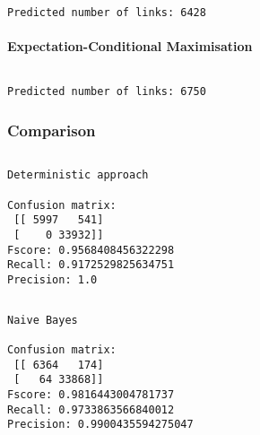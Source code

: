 \documentclass{article}
\begin{document}
    \begin{Verbatim}[commandchars=\\\{\}]
Predicted number of links: 6428

    \end{Verbatim}

    \hypertarget{expectation-conditional-maximisation}{%
\paragraph{Expectation-Conditional
Maximisation}\label{expectation-conditional-maximisation}}

    \begin{Verbatim}[commandchars=\\\{\}]

\end{Verbatim}

    \begin{Verbatim}[commandchars=\\\{\}]
Predicted number of links: 6750

    \end{Verbatim}

    \hypertarget{comparison}{%
\subsubsection{Comparison}\label{comparison}}

    \begin{Verbatim}[commandchars=\\\{\}]

\end{Verbatim}

    \begin{Verbatim}[commandchars=\\\{\}]
Deterministic approach 

Confusion matrix: 
 [[ 5997   541]
 [    0 33932]]
Fscore: 0.9568408456322298
Recall: 0.9172529825634751
Precision: 1.0

    \end{Verbatim}

    \begin{Verbatim}[commandchars=\\\{\}]

\end{Verbatim}

    \begin{Verbatim}[commandchars=\\\{\}]
Naive Bayes 

Confusion matrix: 
 [[ 6364   174]
 [   64 33868]]
Fscore: 0.9816443004781737
Recall: 0.9733863566840012
Precision: 0.9900435594275047

    \end{Verbatim}
\end{document}

